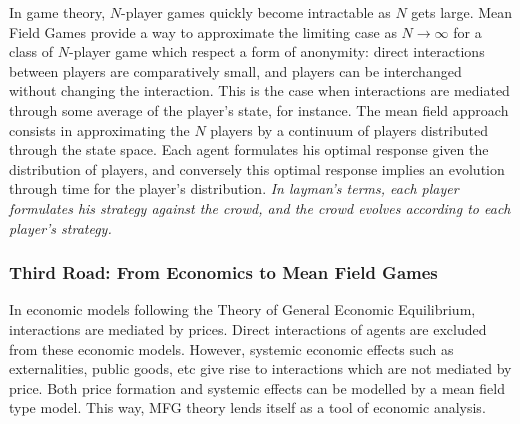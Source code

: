 {In game theory, $N$-player games quickly become intractable as $N$ gets large. Mean Field Games provide a way to approximate the limiting case as $N \to \infty$ for a class of $N$-player game which respect a form of anonymity: direct interactions between players are comparatively small, and players can be interchanged without changing the interaction. This is the case when interactions are mediated through some average of the player's state, for instance.
The mean field approach consists in approximating the $N$ players by a continuum of players distributed through the state space. Each agent formulates his optimal response given the distribution of players, and conversely this optimal response implies an evolution through time for the player's distribution.
\textit{In layman's terms, each player formulates his strategy against the crowd, and the crowd evolves according to each player's strategy.}

\subsubsection{Third Road: From Economics to Mean Field Games}
In economic models following the Theory of General Economic Equilibrium, interactions are mediated by prices. Direct interactions of agents are excluded from these economic models. However, systemic economic effects such as externalities, public goods, etc give rise to interactions which are not mediated by price. Both price formation and systemic effects can be modelled by a mean field type model. This way, MFG theory lends itself as a tool of economic analysis.
}\fi